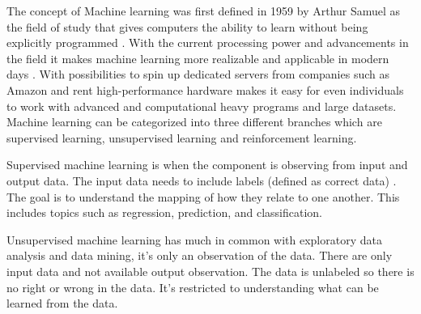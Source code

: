 \documentclass[a4paper]{article}
\begin{document}
The concept of Machine learning was first defined in 1959 by Arthur Samuel as the field of study that gives computers the ability to learn without being explicitly programmed \cite{9781461387183}. With the current processing power and advancements in the field it makes machine learning more realizable and applicable in modern days \cite{ImportanceML}. With possibilities to spin up dedicated servers from companies such as Amazon and rent high-performance hardware makes it easy for even individuals to work with advanced and computational heavy programs and large datasets. 	Machine learning can be categorized into three different branches which are supervised learning, unsupervised learning and reinforcement learning.

Supervised machine learning is when the component is observing from input and output data. The input data needs to include labels (defined as correct data) \cite{supervised}. The goal is to understand the mapping of how they relate to one another. This includes topics such as regression, prediction, and classification. 

Unsupervised machine learning has much in common with exploratory data analysis and data mining, it's only an observation of the data. There are only input data and not available output observation. The data is unlabeled so there is no right or wrong in the data. It's restricted to understanding what can be learned from the data.
% 
% 
% 
\end{document}
